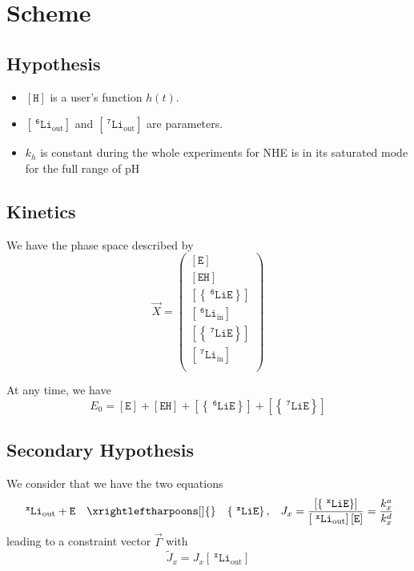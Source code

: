 \documentclass[aps,onecolumn,12pt]{revtex4}
\newcommand{\mychem}[1]{\mathtt{#1}}
\newcommand{\myconc}[1]{\left\lbrack{#1}\right\rbrack}
\newcommand{\spLi}[1]{{~^{\mychem{#1}}\mychem{Li}}}
\newcommand{\spEout}{\mychem{E}}
\newcommand{\Eout}{\myconc{\spEout}}
\newcommand{\spLiE}[1]{\left\lbrace\spLi{#1}\spEout\right\rbrace}
\newcommand{\LiE}[1]{\myconc{\spLiE{#1}}}
\newcommand{\spLiIn}[1]{{\spLi{#1}}_{\mathrm{in}}}
\newcommand{\LiIn}[1]{\myconc{\spLiIn{#1}}}
\newcommand{\spLiOut}[1]{{\spLi{#1}}_{\mathrm{out}}}
\newcommand{\LiOut}[1]{\myconc{\spLiOut{#1}}}
\newcommand{\spEHin}{\mychem{EH}}
\newcommand{\EHin}{\myconc{\spEHin}}
\newcommand{\spproton}{\mychem{H}}
\newcommand{\proton}{\myconc{\spproton}}
\begin{document}
\section{Scheme}

\subsection{Hypothesis}
\begin{itemize}
\item $\proton$ is a  user's function $h(t)$.
\item $\LiOut{6}$ and  $\LiOut{7}$ are parameters.
\item $k_h$ is constant during the whole experiments for NHE is in its saturated mode for the full range of pH
\end{itemize}

\subsection{Kinetics}
We have the phase space described by
\begin{equation}
 \vec{X} = 
        \begin{pmatrix}
        \Eout\\
        \EHin\\
        \LiE{6}\\
        \LiIn{6}\\
        \LiE{7}\\
        \LiIn{7}\\
        \end{pmatrix}
\end{equation}

At any time, we  have
\begin{equation} 
	\label{eq:E0}
	E_0 = \Eout + \EHin +  \LiE{6} + \LiE{7}
\end{equation}

\subsection{Secondary Hypothesis}
We consider that we have the two equations
\begin{equation}
	\begin{array}{rcll}
	 \spLiOut{x} +  \spEout &  \xrightleftharpoons[]{} & \spLiE{x}, & J_x = \dfrac{\LiE{x}}{\LiOut{x} \Eout} = \dfrac{k_x^a}{k_x^d}\\
	 \end{array}
\end{equation}
leading to a constraint vector $\vec{\Gamma}$
with 
\begin{equation}
	\tilde{J}_x = J_x \LiOut{x}
\end{equation}
\end{document}
